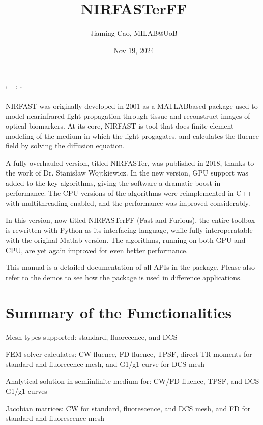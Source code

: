 \documentclass[letterpaper,10pt,english]{sphinxmanual}
\title{NIRFASTerFF}
\date{Nov 19, 2024}
\author{Jiaming Cao, MILAB@UoB}
\begin{document}
\ifdefined\shorthandoff
  \ifnum\catcode`\=\string=\active\shorthandoff{=}\fi
  \ifnum\catcode`\"=\active{}\fi
\fi

\pagestyle{empty}
\sphinxmaketitle
\pagestyle{plain}
\sphinxtableofcontents
\pagestyle{normal}
\label{\detokenize{index::doc}}


\sphinxAtStartPar
NIRFAST was originally developed in 2001 as a MATLAB\sphinxhyphen{}based package used to model near\sphinxhyphen{}infrared light propagation through tissue and reconstruct images of optical biomarkers. At its core, NIRFAST is tool that does finite element modeling of the medium in which the light progagates, and calculates the fluence field by solving the diffusion equation.

\sphinxAtStartPar
A fully overhauled version, titled NIRFASTer, was published in 2018, thanks to the work of Dr. Stanisław Wojtkiewicz. In the new version, GPU support was added to the key algorithms, giving the software a dramatic boost in performance. The CPU versions of the algorithms were re\sphinxhyphen{}implemented in C++ with multithreading enabled, and the performance was improved considerably.

\sphinxAtStartPar
In this version, now titled NIRFASTerFF (Fast and Furious), the entire toolbox is re\sphinxhyphen{}written with Python as its interfacing language, while fully inter\sphinxhyphen{}operatable with the original Matlab version. The algorithms, running on both GPU and CPU, are yet again improved for even better performance.

\sphinxAtStartPar
This manual is a detailed documentation of all APIs in the package. Please also refer to the demos to see how the package is used in difference applications.


\chapter{Summary of the Functionalities}
\label{\detokenize{index:summary-of-the-functionalities}}
\sphinxAtStartPar
Mesh types supported: standard, fluorecence, and DCS

\sphinxAtStartPar
FEM solver calculates: CW fluence, FD fluence, TPSF, direct TR moments for standard and fluorecence mesh, and G1/g1 curve for DCS mesh

\sphinxAtStartPar
Analytical solution in semi\sphinxhyphen{}infinite medium for: CW/FD fluence, TPSF, and DCS G1/g1 curves

\sphinxAtStartPar
Jacobian matrices: CW for standard, fluorescence, and DCS mesh, and FD for standard and fluorescence mesh
\end{document}
